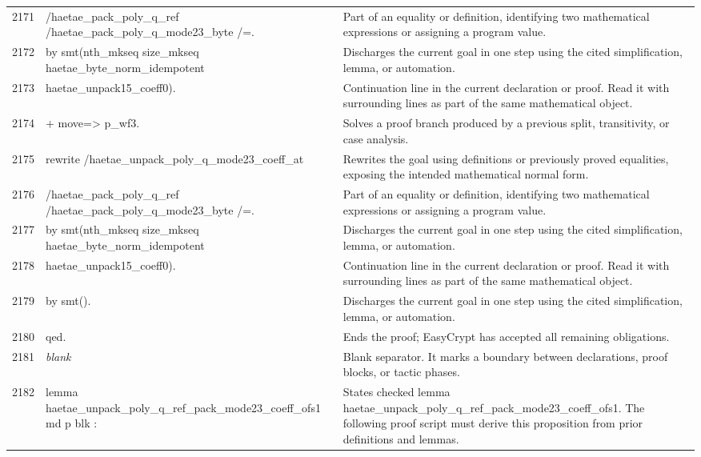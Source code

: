 \documentclass[10pt]{article}
\begin{document}
\begin{longtable}{r L{0.53\textwidth} L{0.37\textwidth}}
2171 & {\ttfamily\scriptsize           /haetae\_pack\_poly\_q\_ref /haetae\_pack\_poly\_q\_mode23\_byte /=.} & Part of an equality or definition, identifying two mathematical expressions or assigning a program value. \\
2172 & {\ttfamily\scriptsize   by smt(nth\_mkseq size\_mkseq haetae\_byte\_norm\_idempotent} & Discharges the current goal in one step using the cited simplification, lemma, or automation. \\
2173 & {\ttfamily\scriptsize          haetae\_unpack15\_coeff0).} & Continuation line in the current declaration or proof.  Read it with surrounding lines as part of the same mathematical object. \\
2174 & {\ttfamily\scriptsize + move=> p\_wf3.} & Solves a proof branch produced by a previous split, transitivity, or case analysis. \\
2175 & {\ttfamily\scriptsize   rewrite /haetae\_unpack\_poly\_q\_mode23\_coeff\_at} & Rewrites the goal using definitions or previously proved equalities, exposing the intended mathematical normal form. \\
2176 & {\ttfamily\scriptsize           /haetae\_pack\_poly\_q\_ref /haetae\_pack\_poly\_q\_mode23\_byte /=.} & Part of an equality or definition, identifying two mathematical expressions or assigning a program value. \\
2177 & {\ttfamily\scriptsize   by smt(nth\_mkseq size\_mkseq haetae\_byte\_norm\_idempotent} & Discharges the current goal in one step using the cited simplification, lemma, or automation. \\
2178 & {\ttfamily\scriptsize          haetae\_unpack15\_coeff0).} & Continuation line in the current declaration or proof.  Read it with surrounding lines as part of the same mathematical object. \\
2179 & {\ttfamily\scriptsize by smt().} & Discharges the current goal in one step using the cited simplification, lemma, or automation. \\
2180 & {\ttfamily\scriptsize qed.} & Ends the proof; EasyCrypt has accepted all remaining obligations. \\
2181 & {\ttfamily\scriptsize \emph{blank}} & Blank separator.  It marks a boundary between declarations, proof blocks, or tactic phases. \\
2182 & {\ttfamily\scriptsize lemma haetae\_unpack\_poly\_q\_ref\_pack\_mode23\_coeff\_ofs1 md p blk :} & States checked lemma haetae\_unpack\_poly\_q\_ref\_pack\_mode23\_coeff\_ofs1.  The following proof script must derive this proposition from prior definitions and lemmas. \\

\end{longtable}
\end{document}
